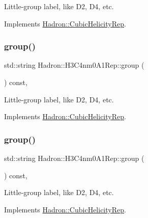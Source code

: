 Little-\/group label, like D2, D4, etc. 

Implements \mbox{\hyperlink{structHadron_1_1CubicHelicityRep_a101a7d76cd8ccdad0f272db44b766113}{Hadron\+::\+Cubic\+Helicity\+Rep}}.

\mbox{\label{structHadron_1_1H3C4nm0A1Rep_a031edbff97795d7fd225e9a3d70b5d8f}} 
\subsubsection{\texorpdfstring{group()}{group()}\hspace{0.1cm}{\footnotesize\ttfamily [3/5]}}
{\footnotesize\ttfamily std\+::string Hadron\+::\+H3\+C4nm0\+A1\+Rep\+::group (\begin{DoxyParamCaption}{ }\end{DoxyParamCaption}) const\hspace{0.3cm}{\ttfamily [inline]}, {\ttfamily [virtual]}}

Little-\/group label, like D2, D4, etc. 

Implements \mbox{\hyperlink{structHadron_1_1CubicHelicityRep_a101a7d76cd8ccdad0f272db44b766113}{Hadron\+::\+Cubic\+Helicity\+Rep}}.

\mbox{\label{structHadron_1_1H3C4nm0A1Rep_a031edbff97795d7fd225e9a3d70b5d8f}} 
\subsubsection{\texorpdfstring{group()}{group()}\hspace{0.1cm}{\footnotesize\ttfamily [4/5]}}
{\footnotesize\ttfamily std\+::string Hadron\+::\+H3\+C4nm0\+A1\+Rep\+::group (\begin{DoxyParamCaption}{ }\end{DoxyParamCaption}) const\hspace{0.3cm}{\ttfamily [inline]}, {\ttfamily [virtual]}}

Little-\/group label, like D2, D4, etc. 

Implements \mbox{\hyperlink{structHadron_1_1CubicHelicityRep_a101a7d76cd8ccdad0f272db44b766113}{Hadron\+::\+Cubic\+Helicity\+Rep}}.


